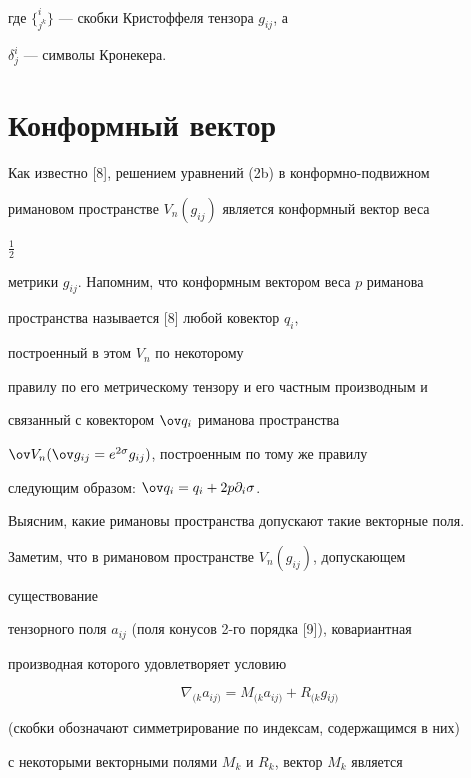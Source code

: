 где $\{^i_{j^k}\}$ --- скобки Кристоффеля тензора $g_{ij}$, а 


$\delta^i_j$ --- символы Кронекера. 


 


\section{Конформный вектор} 


 


Как известно [8], решением уравнений (2b) в конформно-подвижном 


римановом пространстве $V_n(g_{ij})$ является конформный вектор веса 


$\frac{1}{2}$ 


метрики $g_{ij}$. Напомним, что конформным вектором веса $p$ риманова 


пространства называется [8] любой ковектор $q_i$, 


построенный в этом $V_n$ по некоторому 


правилу по его метрическому тензору и его частным производным и 


связанный с ковектором $\ov q_i$ риманова пространства 


$\ov V_n(\ov g_{ij}=e^{2\sigma}g_{ij})$, построенным по тому же правилу 


следующим образом: $\ov q_i=q_i+2p\partial_i\sigma$. 


Выясним, какие римановы пространства допускают такие векторные поля. 


 


Заметим, что в римановом пространстве $V_n(g_{ij})$, допускающем 


существование 


тензорного поля $a_{ij}$ (поля конусов 2-го порядка [9]), ковариантная 


производная которого удовлетворяет условию 


\begin{equation} 


\nabla{}_{(k}a{}_{ij)}=M{}_{(k}a{}_{ij)}+ 


R{}_{(k}g{}_{ij)} 


\end{equation} 


(скобки обозначают симметрирование по индексам, содержащимся в них) 


с некоторыми векторными полями $M_k$ и $R_k$, вектор $M_k$ является 


